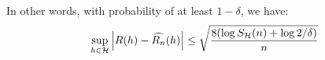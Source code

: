 \begin{solution*}
    \noindent In other words, with probability of at least $1-\delta$, we have:
    \begin{align*}
        \sup_{h\in\mathcal{H}} \Big| R(h) - \widehat{R_n}(h) \Big| \le \sqrt{
            \frac{8(\log S_{\mathcal{H}}(n) + \log 2/\delta)}{n}
        }
    \end{align*}
\end{solution*}
